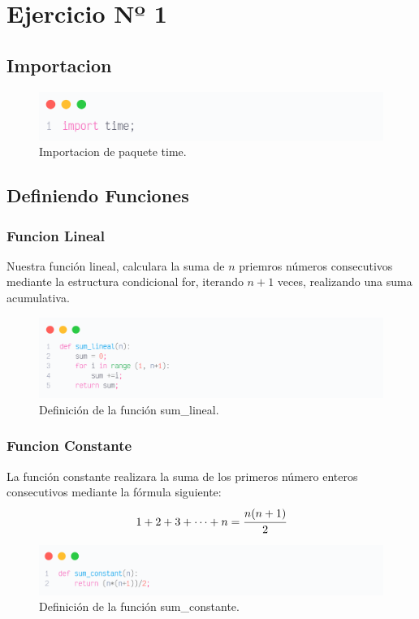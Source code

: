 \section{Ejercicio Nº 1}

\subsection{Importacion}
\begin{figure}[H]
	\centering
	\includegraphics[width=1\textwidth]{Images/code1.png}
	\caption{Importacion de paquete {\color{azulfor} time}.}\label{fig:fg1}
\end{figure}
\subsection{Definiendo Funciones}
\subsubsection{Funcion Lineal}
Nuestra función lineal, calculara la suma de $n$ priemros números consecutivos
mediante la estructura condicional for, iterando $n+1$ veces, realizando una
suma acumulativa.
\begin{figure}[H]
	\centering
	\includegraphics[width=1\textwidth]{Images/code2.png}
	\caption{Definición de la función {\color{azulfor} sum\_lineal}.}\label{fig:fg2}
\end{figure}
\subsubsection{Funcion Constante}
La función constante realizara la suma de los primeros número enteros
consecutivos mediante la fórmula siguiente:
\[1+2+3+\cdots+n=\cfrac{n(n+1)}{2}\]
\begin{figure}[H]
	\centering
	\includegraphics[width=1\textwidth]{Images/code3.png}
	\caption{Definición de la función {\color{azulfor} sum\_constante}.}\label{fig:fg3}
\end{figure}
